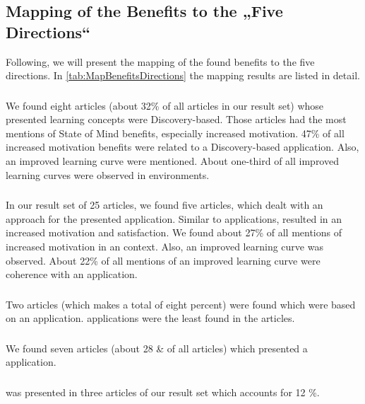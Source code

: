 \subsection{Mapping of the Benefits to the „Five Directions“}
\label{subsec:Mapping}
Following, we will present the mapping of the found benefits to the five directions. In \ref{tab:MapBenefitsDirections} the mapping results are listed in detail. 

\subsubsection{\DBLns}
We found eight articles (about 32\% of all articles in our result set) whose presented learning concepts were Discovery-based. Those articles had the most mentions of State of Mind benefits, especially increased motivation. 47\% of all increased motivation benefits were related to a Discovery-based \AR application. Also, an improved learning curve were mentioned. About one-third of all improved learning curves were observed in \DBL environments.

\subsubsection{\OMns}
In our result set of 25 articles, we found five articles, which dealt with an \OM approach for the presented \AR application. Similar to \DBL applications, \OM resulted in an increased motivation and satisfaction. We found about 27\% of all mentions of increased motivation in an \OM context. Also, an improved learning curve was observed. About 22\% of all mentions of an improved learning curve were coherence with an \OM application.

\subsubsection{\ARBns}
Two articles (which makes a total of eight percent) were found which were based on an \ARB application. \ARB applications were the least found in the articles.

\subsubsection{\STns}
We found seven articles (about 28 \& of all articles) which presented a \ST \AR application.

\subsubsection{\ARGns}
\ARG was presented in three articles of our result set which accounts for 12 \%.

